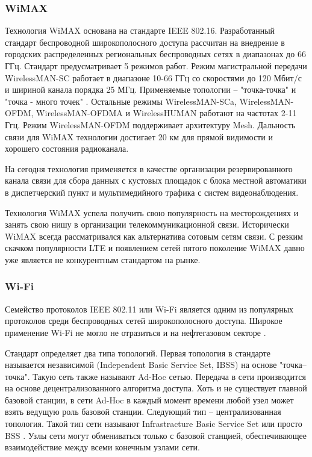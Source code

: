 \subsubsection{WiMAX}
Технология WiMAX основана на стандарте IEEE 802.16. Разработанный стандарт беспроводной широкополосного доступа рассчитан на внедрение в городских распределенных региональных беспроводных сетях в диапазонах до 66 ГГц. Стандарт предусматривает 5 режимов работ. Режим магистральной передачи WirelessMAN-SC работает в диапазоне 10-66 ГГц со скоростями до 120 Мбит/с и шириной канала порядка 25 МГц. Применяемые топологии -- "точка-точка" и "точка - много точек" \cite{Vishnevsky2009}. Остальные режимы WirelessMAN-SCa, WirelessMAN-OFDM, WirelessMAN-OFDMA и  WirelessHUMAN работают на частотах 2-11 Ггц. Режим WirelessMAN-OFDM поддерживает архитектуру Mesh. Дальность связи для WiMAX технологии достигает 20 км для прямой видимости и хорошего состояния радиоканала.

На сегодня технология применяется в качестве организации резервированного канала связи для сбора данных с кустовых площадок с блока местной автоматики в диспетчерский пункт и мультимедийного трафика с систем видеонаблюдения. 

Технология WiMAX успела получить свою популярность на месторождениях и занять свою нишу в организации телекоммуникационной связи. Исторически WiMAX всегда рассматривался как альтернатива сотовым сетям связи. С резким скачком популярности LTE и появлением сетей пятого поколение WiMAX давно уже является не конкурентным стандартом на рынке.

\subsubsection{Wi-Fi}

Семейство протоколов IEEE 802.11 или Wi-Fi является одним из популярных протоколов среди беспроводных сетей широкополосного доступа. Широкое применение Wi-Fi не могло не отразиться и на нефтегазовом секторе . 

Стандарт определяет два типа топологий. Первая топология в стандарте называется независимой (Independent Basic Service Set, IBSS) на основе "точка-- точка". Такую сеть также называют Ad-Hoc сетью. Передача в сети производится на основе децентрализованного алгоритма доступа. Хоть и не существует главной базовой станции, в сети Ad-Hoc в каждый момент времени любой узел может взять ведущую роль базовой станции. Следующий тип -- централизованная топология. Такой тип сети называют Infrastracture  Basic Service Set или просто BSS \cite{Olifer2020}. Узлы сети могут обмениваться только с базовой станцией, обеспечивающее взаимодействие между всеми конечным узлами сети. 
 
